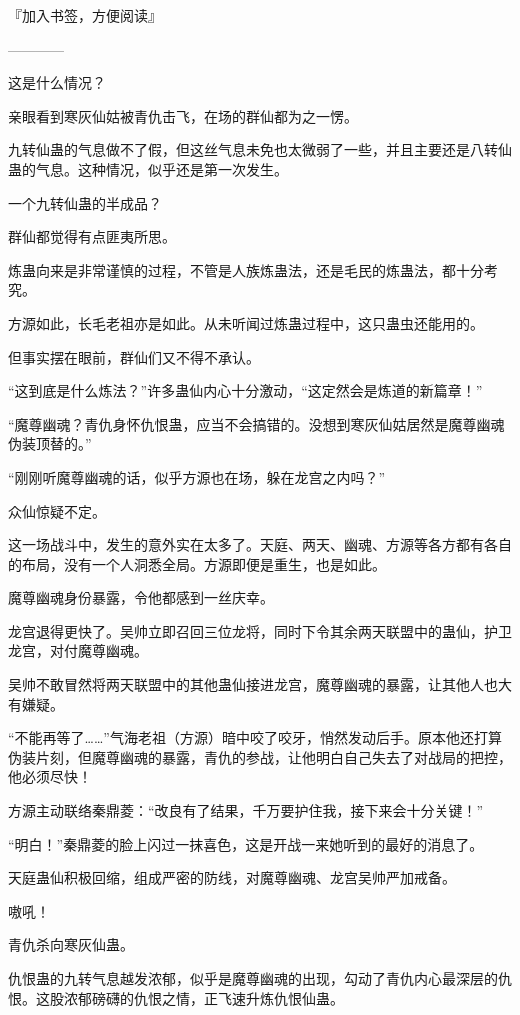 
\begin{this_body}

『加入书签，方便阅读』

------------

这是什么情况？

亲眼看到寒灰仙姑被青仇击飞，在场的群仙都为之一愣。

九转仙蛊的气息做不了假，但这丝气息未免也太微弱了一些，并且主要还是八转仙蛊的气息。这种情况，似乎还是第一次发生。

一个九转仙蛊的半成品？

群仙都觉得有点匪夷所思。

炼蛊向来是非常谨慎的过程，不管是人族炼蛊法，还是毛民的炼蛊法，都十分考究。

方源如此，长毛老祖亦是如此。从未听闻过炼蛊过程中，这只蛊虫还能用的。

但事实摆在眼前，群仙们又不得不承认。

“这到底是什么炼法？”许多蛊仙内心十分激动，“这定然会是炼道的新篇章！”

“魔尊幽魂？青仇身怀仇恨蛊，应当不会搞错的。没想到寒灰仙姑居然是魔尊幽魂伪装顶替的。”

“刚刚听魔尊幽魂的话，似乎方源也在场，躲在龙宫之内吗？”

众仙惊疑不定。

这一场战斗中，发生的意外实在太多了。天庭、两天、幽魂、方源等各方都有各自的布局，没有一个人洞悉全局。方源即便是重生，也是如此。

魔尊幽魂身份暴露，令他都感到一丝庆幸。

龙宫退得更快了。吴帅立即召回三位龙将，同时下令其余两天联盟中的蛊仙，护卫龙宫，对付魔尊幽魂。

吴帅不敢冒然将两天联盟中的其他蛊仙接进龙宫，魔尊幽魂的暴露，让其他人也大有嫌疑。

“不能再等了……”气海老祖（方源）暗中咬了咬牙，悄然发动后手。原本他还打算伪装片刻，但魔尊幽魂的暴露，青仇的参战，让他明白自己失去了对战局的把控，他必须尽快！

方源主动联络秦鼎菱：“改良有了结果，千万要护住我，接下来会十分关键！”

“明白！”秦鼎菱的脸上闪过一抹喜色，这是开战一来她听到的最好的消息了。

天庭蛊仙积极回缩，组成严密的防线，对魔尊幽魂、龙宫吴帅严加戒备。

嗷吼！

青仇杀向寒灰仙蛊。

仇恨蛊的九转气息越发浓郁，似乎是魔尊幽魂的出现，勾动了青仇内心最深层的仇恨。这股浓郁磅礴的仇恨之情，正飞速升炼仇恨仙蛊。


\end{this_body}
